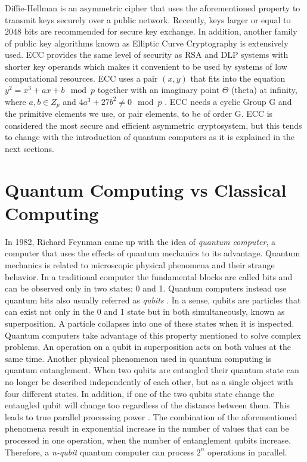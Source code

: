 \documentclass[conference, letterpaper]{IEEEtran}
\begin{document}
Diffie-Hellman is an asymmetric cipher that uses the aforementioned property to transmit keys securely over a public network. Recently, keys larger or equal to $2048$ bits are recommended for secure key exchange. In addition, another family of public key algorithms known as Elliptic Curve Cryptography is extensively used. ECC provides the same level of security as RSA and DLP systems with shorter key operands which makes it convenient to be used by systems of low computational resources. ECC uses a pair $(x,y)$ that fits into the equation $y^2=x^3+ax+b\mod p$ together with an imaginary point $\Theta$ (theta) at infinity, where $a,b \in Z_{p}$ and $4a^3+27b^2 \neq 0\mod p$ \cite{Paar2010}. ECC needs a cyclic Group G and the primitive elements we use, or pair elements, to be of order G. ECC is considered the most secure and efficient asymmetric cryptosystem, but this tends to change with the introduction of quantum computers as it is explained in the next sections.


\section{Quantum Computing vs Classical Computing} \label{Quantum_computing}
In 1982, Richard Feynman came up with the idea of \textit{quantum computer}, a computer that uses the effects of quantum mechanics to its advantage. Quantum mechanics is related to microscopic physical phenomena and their strange behavior. In a traditional computer the fundamental blocks are called bits and can be observed only in two states; 0 and 1. Quantum computers instead use quantum bits also usually referred as \textit{qubits} \cite{Nielsen:2011:QCQ:1972505}. In a sense, qubits are particles that can exist not only in the 0 and 1 state but in both  simultaneously, known as superposition. A particle collapses into one of these states when it is inspected. Quantum computers take advantage of this property mentioned to solve complex problems. An operation on a qubit in superposition acts on both values at the same time. 
Another physical phenomenon used in quantum computing is quantum entanglement. When two qubits are entangled their quantum state can no longer be described independently of each other, but as a single object with four different states. In addition, if one of the two qubits state change the entangled qubit will change too regardless of the distance between them. This leads to true parallel processing power \cite{Quantum_entanglement}.
The combination of the aforementioned phenomena result in exponential increase in the number of values that can be processed in one operation, when the number of entanglement qubits increase. Therefore, a \textit{n-qubit} quantum computer can process $2^n$ operations in parallel.
\end{document}
